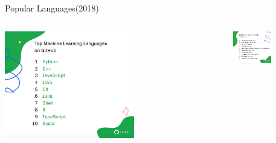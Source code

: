 \documentclass[notes, ignorenonframetext, compress, 10pt, xcolor=svgnames, aspectratio=169]{beamer}
\begin{document}
\begin{frame}[allowframebreaks]{Popular Languages(2018)}
  \begin{columns}[T] %
       \begin{column}{0.5\textwidth}
       \begin{center}
   \includegraphics[width=0.6\textwidth]{../../Ressources/Figs/Fig_MostPopular2018.png}
    \end{center}
   \end{column}%
   \hfill%
   \begin{column}{0.6\textwidth}
       \begin{center}
\includegraphics[width=0.5\textwidth]{../../Ressources/Figs/Fig_ProjectsGit2018.png}
 \end{center}
   \end{column}
 \end{columns}
\end{frame}
\end{document}
